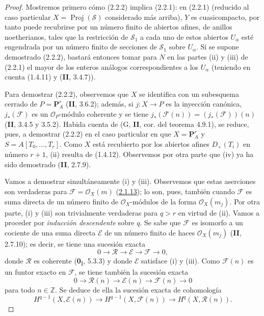 \begin{proof}
Mostremos primero cómo (2.2.2) implica (2.2.1): en (2.2.1) (reducido al caso particular $X=\operatorname{Proj}(\mathcal S)$ considerado más arriba), $Y$ es cuasicompacto, por tanto puede recubrirse por un número finito de abiertos afines, de anillos noetherianos, tales que la restricción de $\mathcal S_1$ a cada uno de estos abiertos $U_\alpha$ esté engendrada por un número finito de secciones de $\mathcal S_1$ sobre $U_\alpha$. Si se supone demostrado (2.2.2), bastará entonces tomar para $N$ en las partes (ii) y (iii) de (2.2.1) el mayor de los enteros análogos correspondientes a los $U_\alpha$ (teniendo en cuenta (1.4.11) y (\textbf{II}, 3.4.7)).

Para demostrar (2.2.2), observemos que $X$ se identifica con un subesquema cerrado de $P=\mathbf P_A^r$ (\textbf{II}, 3.6.2); además, si $j:X\to P$ es la inyección canónica, $j_*(\mathcal F)$ es un $\mathcal O_P$-módulo coherente y se tiene $j_*(\mathcal F(n))=(j_*(\mathcal F))(n)$ (\textbf{II}, 3.4.5 y 3.5.2). Habida cuenta de (G, \textbf{II}, cor. del teorema 4.9.1), se reduce, pues, a demostrar (2.2.2) en el caso particular en que $X=\mathbf P_A^r$ y $S=A[T_0,\ldots,T_r]$. Como $X$ está recubierto por los abiertos
afines $D_+(T_i)$ en número $r+1$, (ii) resulta de (1.4.12). Observemos por otra parte que (iv) ya ha sido demostrado (\textbf{II}, 2.7.9).

Vamos a demostrar simultáneamente (i) y (iii). Observemos que estas aserciones son verdaderas para $\mathcal F=\mathcal O_X(m)$ (\hyperref[III.2.1.13-fr]{2.1.13}); lo son, pues, también cuando $\mathcal F$ es suma directa de un número finito de $\mathcal O_X$-módulos de la forma $\mathcal O_X(m_j)$. Por otra parte, (i) y (iii) son trivialmente verdaderas para $q>r$ en virtud de (ii). Vamos a proceder por \emph{inducción descendente} sobre $q$. Se sabe que $\mathcal F$ es isomorfo a un cociente de una suma directa $\mathcal E$ de un número finito de haces $\mathcal O_X(m_j)$ (\textbf{II}, 2.7.10); es decir, se tiene una sucesión exacta
\[
0\longrightarrow\mathcal R\longrightarrow\mathcal E
\longrightarrow\mathcal F\longrightarrow0,
\]
donde $\mathcal R$ es coherente (\textbf{0}\textsubscript{I}, 5.3.3) y donde $\mathcal E$ satisface (i) y (iii). Como $\mathcal F(n)$ es un funtor exacto en $\mathcal F$, se tiene también la sucesión exacta
\[
0\longrightarrow\mathcal R(n)\longrightarrow\mathcal E(n)
\longrightarrow\mathcal F(n)\longrightarrow0
\]
para todo $n\in\mathbb Z$. Se deduce de ella la sucesión exacta de cohomología
\[
H^{q-1}(X,\mathcal E(n))\longrightarrow
H^{q-1}(X,\mathcal F(n))\longrightarrow
H^q(X,\mathcal R(n)).
\]


\end{proof}
